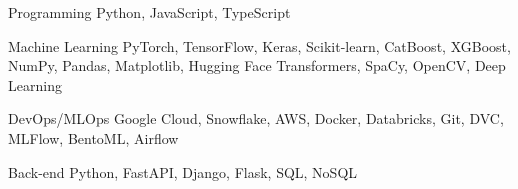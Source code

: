 

\begin{cvskills}

\cvskill
{Programming} %
{Python, JavaScript, TypeScript} %

\cvskill
{Machine Learning} %
{PyTorch, TensorFlow, Keras, Scikit-learn, CatBoost, XGBoost, NumPy, Pandas, Matplotlib, Hugging Face Transformers, SpaCy, OpenCV, Deep Learning} %

\cvskill
{DevOps/MLOps} %
{Google Cloud, Snowflake, AWS, Docker, Databricks, Git, DVC, MLFlow, BentoML, Airflow} %

\cvskill
{Back-end} %
{Python, FastAPI, Django, Flask, SQL, NoSQL} %




\end{cvskills}
